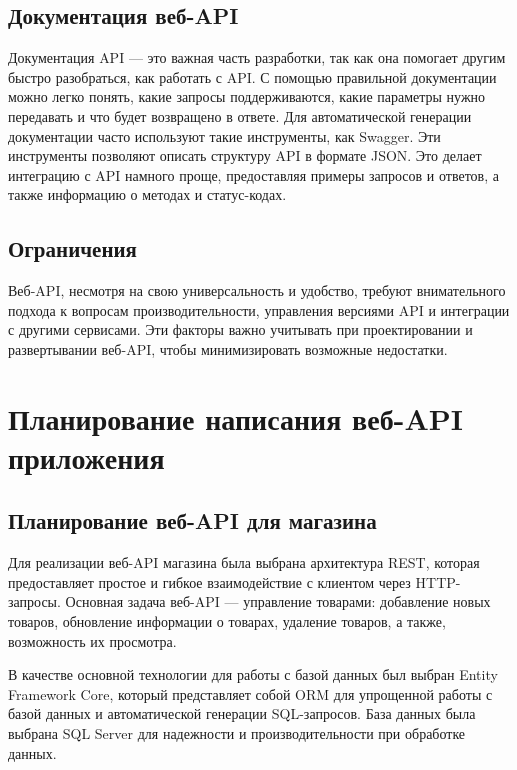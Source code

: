 \documentclass[a4paper,12pt]{report}
\begin{document}
\subsection{Документация веб-\acs{API}}

Документация \acs{API} --- это важная часть разработки, так как она помогает другим 
быстро разобраться, как работать с \acs{API}. С помощью правильной документации можно легко понять, какие запросы поддерживаются, 
какие параметры нужно передавать и что будет возвращено в ответе. 
Для автоматической генерации документации часто используют такие инструменты, как Swagger. 
Эти инструменты позволяют описать структуру \acs{API} в формате \acs{JSON}. Это делает интеграцию с \acs{API} 
намного проще, предоставляя примеры запросов и ответов, а также информацию о методах и статус-кодах.

\subsection{Ограничения}

Веб-\acs{API}, несмотря на свою универсальность и удобство, требуют внимательного подхода к вопросам производительности, 
управления версиями \acs{API} и интеграции с другими сервисами. Эти факторы важно учитывать 
при проектировании и развертывании веб-\acs{API}, чтобы минимизировать возможные недостатки.

\section{Планирование написания веб-\acs{API} приложения}

\subsection{Планирование веб-\acs{API} для магазина}

Для реализации веб-\acs{API} магазина была выбрана архитектура \acs{REST}, которая предоставляет простое и гибкое взаимодействие с клиентом через \acs{HTTP}-запросы. 
Основная задача веб-\acs{API} --- управление товарами: добавление новых товаров, обновление информации о товарах, удаление товаров, а также, возможность их просмотра.

В качестве основной технологии для работы с базой данных был выбран Entity Framework Core, который представляет собой \acs{ORM} для упрощенной работы с базой данных 
и автоматической генерации \acs{SQL}-запросов. База данных была выбрана \acs{SQL} Server для надежности и производительности при обработке данных.
\end{document}
